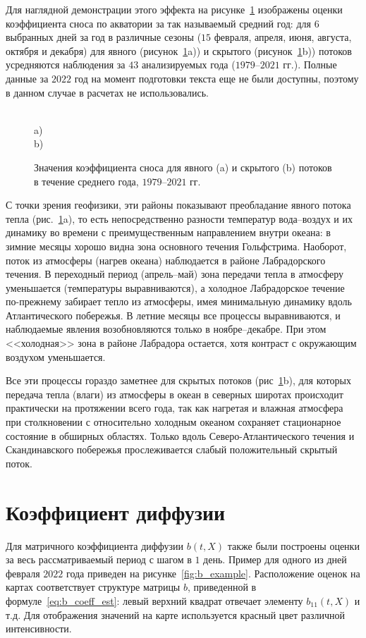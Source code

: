 Для наглядной демонстрации этого эффекта на рисунке~\ref{fig:ab_mean_year} изображены оценки коэффициента сноса по акватории за так называемый средний год: для $6$ выбранных дней за год в различные сезоны ($15$ февраля, апреля, июня, августа, октября и декабря) для явного (рисунок~\ref{fig:ab_mean_year}a)) и скрытого (рисунок~\ref{fig:ab_mean_year}b)) потоков усредняются наблюдения за $43$ анализируемых года ($1979$--$2021$ гг.). Полные данные за $2022$ год на момент подготовки текста еще не были доступны, поэтому в данном случае в расчетах не использовались.

\begin{figure}[h!]
	\\
	a)
	\\
	b)
	
	\caption{Значения коэффициента сноса для явного (a) и скрытого (b) потоков в течение среднего года, $1979$--$2021$ гг.} 
	\label{fig:ab_mean_year}
\end{figure}

С точки зрения геофизики, эти районы показывают преобладание явного потока тепла (рис.~\ref{fig:ab_mean_year}a), то есть непосредственно разности температур вода--воздух и их динамику во времени с преимущественным направлением внутри океана: в зимние месяцы хорошо видна зона основного течения Гольфстрима. Наоборот, поток из атмосферы (нагрев океана) наблюдается в районе Лабрадорского течения. В переходный период (апрель--май) зона передачи тепла в атмосферу уменьшается (температуры выравниваются), а холодное Лабрадорское течение по-прежнему забирает тепло из атмосферы, имея минимальную динамику вдоль Атлантического побережья. В летние месяцы все процессы выравниваются, и наблюдаемые явления возобновляются только в ноябре--декабре. При этом <<холодная>> зона в районе Лабрадора остается, хотя контраст с окружающим воздухом уменьшается.

Все эти процессы гораздо заметнее для скрытых потоков (рис~\ref{fig:ab_mean_year}b), для которых передача тепла (влаги) из атмосферы в океан в северных широтах происходит практически на протяжении всего года, так как нагретая и влажная атмосфера при столкновении с относительно холодным океаном сохраняет стационарное состояние в обширных областях. Только вдоль Северо-Атлантического течения и Скандинавского побережья прослеживается слабый положительный скрытый поток. 

\section{Коэффициент диффузии}
Для матричного коэффициента диффузии $b(t,X)$ также были построены оценки за весь рассматриваемый период с шагом в $1$ день. Пример для одного из дней февраля $2022$ года приведен на рисунке~\ref{fig:b_example}. Расположение оценок на картах соответствует структуре матрицы $b$, приведенной в формуле~\eqref{eq:b_coeff_est}: левый верхний квадрат отвечает элементу $b_{11}(t,X)$ и т.д. Для отображения значений на карте используется красный цвет различной интенсивности.

